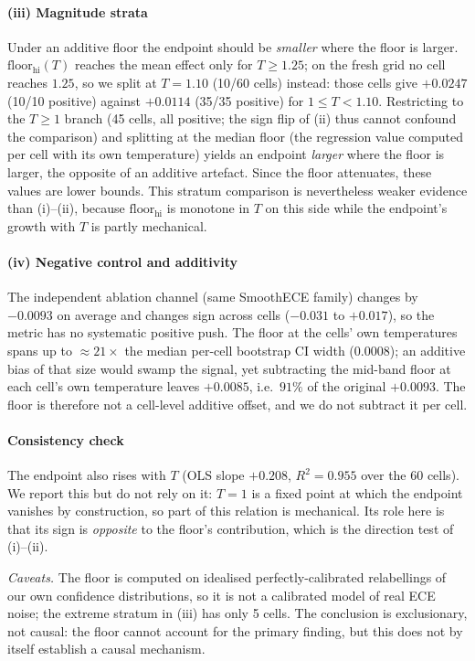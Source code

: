 \documentclass[final,5p,times,nonatbib]{elsarticle}
\begin{document}
\paragraph{(iii) Magnitude strata} Under an additive floor the endpoint
should be \emph{smaller} where the floor is larger.
$\text{floor}_{\text{hi}}(T)$ reaches the mean effect only for
$T \geq 1.25$; on the fresh grid no cell reaches $1.25$, so we split at
$T = 1.10$ (10/60 cells) instead: those cells give $+0.0247$ (10/10
positive) against $+0.0114$ (35/35 positive) for $1 \leq T < 1.10$.
Restricting to the
$T \geq 1$ branch (45 cells, all positive; the sign flip of (ii) thus
cannot confound the comparison) and splitting at the median floor (the
regression value computed per cell with its own temperature) yields an
endpoint \emph{larger} where the floor is larger, the opposite of an
additive artefact. Since the floor attenuates, these values are lower
bounds. This stratum comparison is nevertheless weaker evidence than
(i)--(ii), because $\text{floor}_{\text{hi}}$ is monotone in $T$ on this
side while the endpoint's growth with $T$ is partly mechanical.

\paragraph{(iv) Negative control and additivity} The independent
ablation channel (same SmoothECE family) changes by $-0.0093$ on average
and changes sign across cells ($-0.031$ to $+0.017$), so the metric has
no systematic positive push. The floor at the cells' own temperatures
spans up to $\approx 21\times$ the median per-cell
bootstrap CI width ($0.0008$); an additive bias of that size would swamp
the signal, yet subtracting the mid-band floor at each cell's own
temperature leaves $+0.0085$, i.e.\ $91\%$ of the original $+0.0093$. The
floor is therefore not a cell-level additive offset, and we do not
subtract it per cell.

\paragraph{Consistency check} The endpoint also rises with $T$ (OLS
slope $+0.208$, $R^2 = 0.955$ over the 60 cells). We report this but do
not rely on it: $T = 1$ is a fixed point at which the endpoint vanishes
by construction, so part of this relation is mechanical. Its role here
is that its sign is \emph{opposite} to the floor's contribution, which is
the direction test of (i)--(ii).

\emph{Caveats.} The floor is computed on idealised perfectly-calibrated
relabellings of our own confidence distributions, so it is not a
calibrated model of real ECE noise; the extreme stratum in (iii) has only
5 cells. The conclusion is exclusionary, not causal: the floor cannot
account for the primary finding, but this does not by itself establish a
causal mechanism.
\end{document}
